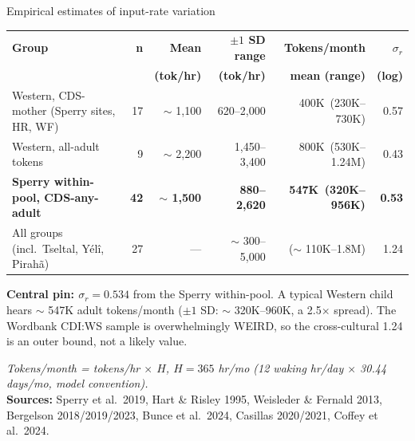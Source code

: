 \documentclass[
  ignorenonframetext,
  aspectratio=169,
  t]{beamer}
\renewcommand{\arraystretch}{1.10}
\begin{document}
\begin{frame}{Empirical estimates of input-rate variation}
\label{empirical-estimates-of-input-rate-variation}
\centering
\scriptsize
\renewcommand{\arraystretch}{1.25}
\begin{tabular}{@{}lrrrrr@{}}
\toprule
\textbf{Group} & \textbf{n} & \textbf{Mean} & \textbf{$\pm 1$ SD range} & \textbf{Tokens/month} & \textbf{$\sigma_r$} \\
              &            & \textbf{(tok/hr)} & \textbf{(tok/hr)} & \textbf{mean (range)} & \textbf{(log)} \\
\midrule
Western, CDS-mother (Sperry sites, HR, WF) & 17 & $\sim$ 1{,}100 & 620--2{,}000 & 400K \,(230K--730K) & 0.57 \\
Western, all-adult tokens                  &  9 & $\sim$ 2{,}200 & 1{,}450--3{,}400 & 800K \,(530K--1.24M) & 0.43 \\
\textbf{Sperry within-pool, CDS-any-adult} & \textbf{42} & \textbf{$\sim$ 1{,}500} & \textbf{880--2{,}620} & \textbf{547K \,(320K--956K)} & \textbf{0.53} \\
All groups (incl.\ Tseltal, Y\'el\^i, Pirah\~a) & 27 & --- & $\sim$ 300--5{,}000 & ($\sim$ 110K--1.8M) & 1.24 \\
\bottomrule
\end{tabular}

\vspace{0.6em}
\footnotesize

\textbf{Central pin: \(\sigma_r = 0.534\)} from the Sperry within-pool.
A typical Western child hears \(\sim\) 547K adult tokens/month
(\(\pm 1\) SD: \(\sim\) 320K--960K, a 2.5\(\times\) spread). The
Wordbank CDI:WS sample is overwhelmingly WEIRD, so the cross-cultural
1.24 is an outer bound, not a likely value.

\vspace{0.3em}
\scriptsize

\emph{Tokens/month = tokens/hr \(\times\) \(H\), \(H = 365\) hr/mo (12
waking hr/day \(\times\) 30.44 days/mo, model convention).}\\
\textbf{Sources:} Sperry et al.~2019, Hart \& Risley 1995, Weisleder \&
Fernald 2013, Bergelson 2018/2019/2023, Bunce et al.~2024, Casillas
2020/2021, Coffey et al.~2024.
\end{frame}
\end{document}
